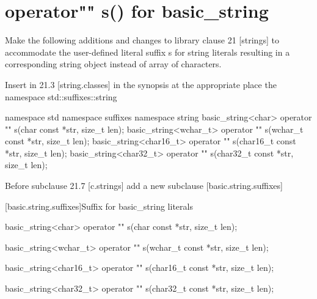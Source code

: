\documentclass[ebook,11pt,article]{memoir}
\begin{document}
\section{operator"" s() for basic_string}
Make the following additions and changes to library clause 21 [strings] to accommodate the user-defined literal suffix s for string literals resulting in a corresponding string object instead of array of characters.

Insert in 21.3 [string.classes] in the synopsis at the appropriate place the namespace std::suffixes::string
\begin{codeblock}
namespace std{
namespace suffixes{
namespace string{
basic_string<char> operator "" s(char const *str, size_t len);
basic_string<wchar_t> operator "" s(wchar_t const *str, size_t len);
basic_string<char16_t> operator "" s(char16_t const *str, size_t len);
basic_string<char32_t> operator "" s(char32_t const *str, size_t len);
}}}
\end{codeblock}

Before subclause 21.7 [c.strings] add a new subclause [basic.string.suffixes]

[basic.string.suffixes]{Suffix for basic_string literals}
\begin{itemdecl}
basic_string<char> operator "" s(char const *str, size_t len);
\end{itemdecl}

\begin{itemdescr}
\pnum
\returns
{}
\end{itemdescr}

\begin{itemdecl}
basic_string<wchar_t> operator "" s(wchar_t const *str, size_t len);
\end{itemdecl}
\begin{itemdescr}
\pnum
\returns
{}
\end{itemdescr}

\begin{itemdecl}
basic_string<char16_t> operator "" s(char16_t const *str, size_t len);
\end{itemdecl}
\begin{itemdescr}
\pnum
\returns
{}
\end{itemdescr}

\begin{itemdecl}
basic_string<char32_t> operator "" s(char32_t const *str, size_t len);
\end{itemdecl}
\begin{itemdescr}
\pnum
\returns
{}
\end{itemdescr}
\end{document}
